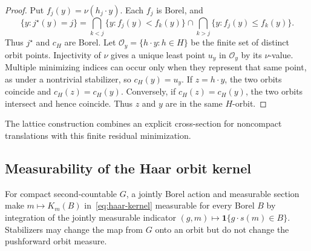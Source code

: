 \documentclass[11pt]{article}
\theoremstyle{plain}
\theoremstyle{definition}
\numberwithin{equation}{section}
\newcommand{\1}{\mathbf 1}
\newcommand{\calO}{\mathcal O}
\begin{document}
\begin{proof}
Put $f_j(y)=\nu(h_j\cdot y)$. Each $f_j$ is Borel, and
\[
\{y:j^\star(y)=j\}
=
\bigcap_{k<j}\{y:f_j(y)<f_k(y)\}
\cap
\bigcap_{k>j}\{y:f_j(y)\le f_k(y)\}.
\]
Thus $j^\star$ and $c_H$ are Borel. Let
$\calO_y=\{h\cdot y:h\in H\}$ be the finite set of distinct orbit points.
Injectivity of $\nu$ gives a unique least point $u_y$ in $\calO_y$ by its
$\nu$-value. Multiple minimizing indices can occur only when they represent
that same point, as under a nontrivial stabilizer, so $c_H(y)=u_y$. If
$z=h\cdot y$, the two orbits coincide and $c_H(z)=c_H(y)$. Conversely, if
$c_H(z)=c_H(y)$, the two orbits intersect and hence coincide. Thus $z$ and
$y$ are in the same $H$-orbit.
\end{proof}

The lattice construction combines an explicit cross-section for noncompact
translations with this finite residual minimization.

\subsection{Measurability of the Haar orbit kernel}

For compact second-countable $G$, a jointly Borel action and measurable section make $m\mapsto K_m(B)$ in~\eqref{eq:haar-kernel} measurable for every Borel $B$ by integration of the jointly measurable indicator $(g,m)\mapsto\1\{g\cdot s(m)\in B\}$. Stabilizers may change the map from $G$ onto an orbit but do not change the pushforward orbit measure.
\end{document}
